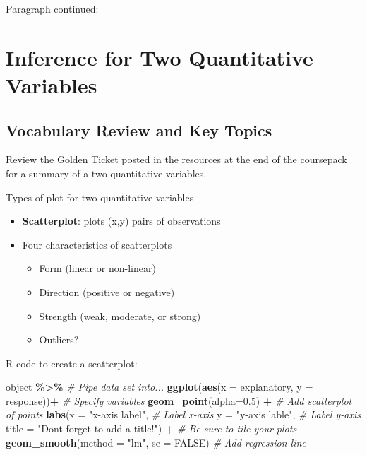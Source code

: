 \documentclass[
]{report}
\newenvironment{Shaded}{\begin{snugshade}}{\end{snugshade}}
\newcommand{\AttributeTok}[1]{\textcolor[rgb]{0.13,0.29,0.53}{#1}}
\newcommand{\CommentTok}[1]{\textcolor[rgb]{0.56,0.35,0.01}{\textit{#1}}}
\newcommand{\ConstantTok}[1]{\textcolor[rgb]{0.56,0.35,0.01}{#1}}
\newcommand{\FloatTok}[1]{\textcolor[rgb]{0.00,0.00,0.81}{#1}}
\newcommand{\FunctionTok}[1]{\textcolor[rgb]{0.13,0.29,0.53}{\textbf{#1}}}
\newcommand{\NormalTok}[1]{#1}
\newcommand{\SpecialCharTok}[1]{\textcolor[rgb]{0.81,0.36,0.00}{\textbf{#1}}}
\newcommand{\StringTok}[1]{\textcolor[rgb]{0.31,0.60,0.02}{#1}}
\begin{document}
\newpage

Paragraph continued:

\newpage

\chapter{Inference for Two Quantitative Variables}\label{inference-for-two-quantitative-variables}

\section{Vocabulary Review and Key Topics}\label{vocabulary-review-and-key-topics-2}

Review the Golden Ticket posted in the resources at the end of the coursepack for a summary of a two quantitative variables.

Types of plot for two quantitative variables

\begin{itemize}
\item
  \textbf{Scatterplot}: plots (x,y) pairs of observations
\item
  Four characteristics of scatterplots

  \begin{itemize}
  \item
    Form (linear or non-linear)
  \item
    Direction (positive or negative)
  \item
    Strength (weak, moderate, or strong)
  \item
    Outliers?
  \end{itemize}
\end{itemize}

R code to create a scatterplot:

\begin{Shaded}
\begin{Highlighting}[]
\NormalTok{object }\SpecialCharTok{\%\textgreater{}\%} \CommentTok{\# Pipe data set into...}
\FunctionTok{ggplot}\NormalTok{(}\FunctionTok{aes}\NormalTok{(}\AttributeTok{x =}\NormalTok{ explanatory, }\AttributeTok{y =}\NormalTok{ response))}\SpecialCharTok{+}  \CommentTok{\# Specify variables}
  \FunctionTok{geom\_point}\NormalTok{(}\AttributeTok{alpha=}\FloatTok{0.5}\NormalTok{) }\SpecialCharTok{+}  \CommentTok{\# Add scatterplot of points}
  \FunctionTok{labs}\NormalTok{(}\AttributeTok{x =} \StringTok{"x{-}axis label"}\NormalTok{,  }\CommentTok{\# Label x{-}axis}
       \AttributeTok{y =} \StringTok{"y{-}axis lable"}\NormalTok{,  }\CommentTok{\# Label y{-}axis}
       \AttributeTok{title =} \StringTok{"Don\textquotesingle{}t forget to add a title!"}\NormalTok{) }\SpecialCharTok{+} 
               \CommentTok{\# Be sure to tile your plots}
  \FunctionTok{geom\_smooth}\NormalTok{(}\AttributeTok{method =} \StringTok{"lm"}\NormalTok{, }\AttributeTok{se =} \ConstantTok{FALSE}\NormalTok{)  }\CommentTok{\# Add regression line}
\end{Highlighting}
\end{Shaded}
\end{document}

